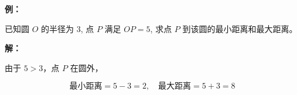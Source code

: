 \begin{examplebox}
\textbf{例：}

已知圆 $O$ 的半径为 $3$,
点 $P$ 满足 $OP=5$,
求点 $P$ 到该圆的最小距离和最大距离。

\textbf{解：}

由于 $5>3$，点 $P$ 在圆外，

\[
\text{最小距离}=5-3=2,
\quad
\text{最大距离}=5+3=8
\]
\end{examplebox}
